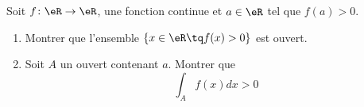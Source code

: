 
\begin{exercice}\label{exoExamDec2011-0002}

    Soit \( f\colon \eR\to \eR\), une fonction continue et \( a\in \eR\) tel que \( f(a)>0\).
    \begin{enumerate}
        \item
            Montrer que l'ensemble \( \{ x\in\eR\tq f(x)>0 \}\) est ouvert.
        \item
            Soit \( A\) un ouvert contenant \( a\). Montrer que
            \begin{equation}
                \int_Af(x)dx>0
            \end{equation}
    \end{enumerate}

\end{exercice}
